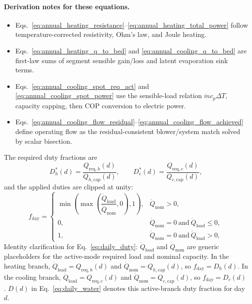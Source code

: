 \documentclass[11pt]{article}
\begin{document}
\paragraph{Derivation notes for these equations.}
\begin{itemize}[leftmargin=*]
\item Eqs.~\eqref{eq:annual_heating_resistance}--\eqref{eq:annual_heating_total_power} follow temperature-corrected resistivity, Ohm's law, and Joule heating.
\item Eqs.~\eqref{eq:annual_heating_q_to_bed} and \eqref{eq:annual_cooling_q_to_bed} are first-law sums of segment sensible gain/loss and latent evaporation sink terms.
\item Eqs.~\eqref{eq:annual_cooling_spot_req_act} and \eqref{eq:annual_cooling_spot_power} use the sensible-load relation \(\dot m c_p \Delta T\), capacity capping, then COP conversion to electric power.
\item Eqs.~\eqref{eq:annual_cooling_flow_residual}--\eqref{eq:annual_cooling_flow_achieved} define operating flow as the residual-consistent blower/system match solved by scalar bisection.
\end{itemize}
The required duty fractions are
\begin{equation}
\label{eq:daily_duty_required}
D_h^\ast(d)=\frac{Q_{\mathrm{req},h}(d)}{Q_{h,\mathrm{cap}}(d)},
\qquad
D_c^\ast(d)=\frac{Q_{\mathrm{req},c}(d)}{Q_{c,\mathrm{cap}}(d)},
\end{equation}
and the applied duties are clipped at unity:
\begin{equation}
\label{eq:daily_duty}
f_{\mathrm{day}}=
\begin{cases}
\min\!\left(\max\!\left(\dfrac{\dot Q_{\mathrm{load}}}{\dot Q_{\mathrm{nom}}},0\right),1\right), & \dot Q_{\mathrm{nom}}>0,\\
0, & \dot Q_{\mathrm{nom}}=0\ \text{and}\ \dot Q_{\mathrm{load}}\le 0,\\
1, & \dot Q_{\mathrm{nom}}=0\ \text{and}\ \dot Q_{\mathrm{load}}>0,
\end{cases}
\end{equation}
Identity clarification for Eq.~\eqref{eq:daily_duty}: \(\dot Q_{\mathrm{load}}\) and \(\dot Q_{\mathrm{nom}}\) are generic placeholders for the active-mode required load and nominal capacity. In the heating branch, \(\dot Q_{\mathrm{load}}=Q_{\mathrm{req},h}(d)\) and \(\dot Q_{\mathrm{nom}}=Q_{h,\mathrm{cap}}(d)\), so \(f_{\mathrm{day}}=D_h(d)\). In the cooling branch, \(\dot Q_{\mathrm{load}}=Q_{\mathrm{req},c}(d)\) and \(\dot Q_{\mathrm{nom}}=Q_{c,\mathrm{cap}}(d)\), so \(f_{\mathrm{day}}=D_c(d)\). \(D(d)\) in Eq.~\eqref{eq:daily_water} denotes this active-branch duty fraction for day \(d\).
\end{document}
